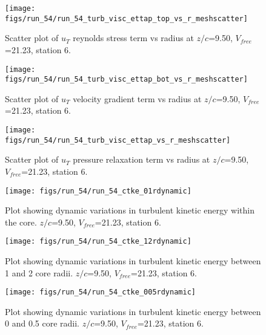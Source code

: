 \begin{figure}[H]
\centering
\texttt{[image: figs/run\_54/run\_54\_turb\_visc\_ettap\_top\_vs\_r\_meshscatter]}
\caption{Scatter plot of $
u_T$ reynolds stress term vs radius at $z/c$=9.50, $V_{free}$=21.23, station 6.}
\label{fig:run_54_turb_visc_ettap_top_vs_r_meshscatter}
\end{figure}


\begin{figure}[H]
\centering
\texttt{[image: figs/run\_54/run\_54\_turb\_visc\_ettap\_bot\_vs\_r\_meshscatter]}
\caption{Scatter plot of $
u_T$ velocity gradient term vs radius at $z/c$=9.50, $V_{free}$=21.23, station 6.}
\label{fig:run_54_turb_visc_ettap_bot_vs_r_meshscatter}
\end{figure}


\begin{figure}[H]
\centering
\texttt{[image: figs/run\_54/run\_54\_turb\_visc\_ettap\_vs\_r\_meshscatter]}
\caption{Scatter plot of $
u_T$ pressure relaxation term vs radius at $z/c$=9.50, $V_{free}$=21.23, station 6.}
\label{fig:run_54_turb_visc_ettap_vs_r_meshscatter}
\end{figure}


\begin{figure}[H]
\centering
\texttt{[image: figs/run\_54/run\_54\_ctke\_01rdynamic]}
\caption{Plot showing dynamic variations in turbulent kinetic energy within the core. $z/c$=9.50, $V_{free}$=21.23, station 6.}
\label{fig:run_54_ctke_01rdynamic}
\end{figure}


\begin{figure}[H]
\centering
\texttt{[image: figs/run\_54/run\_54\_ctke\_12rdynamic]}
\caption{Plot showing dynamic variations in turbulent kinetic energy between 1 and 2 core radii. $z/c$=9.50, $V_{free}$=21.23, station 6.}
\label{fig:run_54_ctke_12rdynamic}
\end{figure}


\begin{figure}[H]
\centering
\texttt{[image: figs/run\_54/run\_54\_ctke\_005rdynamic]}
\caption{Plot showing dynamic variations in turbulent kinetic energy between 0 and 0.5 core radii. $z/c$=9.50, $V_{free}$=21.23, station 6.}
\label{fig:run_54_ctke_005rdynamic}
\end{figure}


